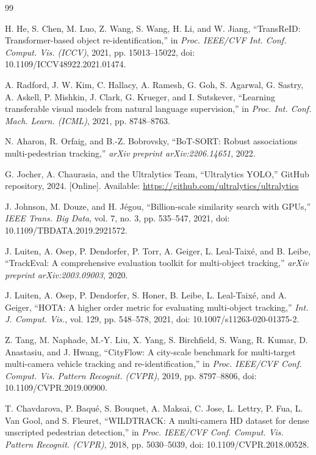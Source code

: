 \documentclass{ieeeaccess}
\begin{document}

\begin{thebibliography}{99}

H. He, S. Chen, M. Luo, Z. Wang, S. Wang, H. Li, and W. Jiang, ``TransReID: Transformer-based object re-identification,'' in \emph{Proc. IEEE/CVF Int. Conf. Comput. Vis. (ICCV)}, 2021, pp. 15013--15022, doi: 10.1109/ICCV48922.2021.01474.

A. Radford, J. W. Kim, C. Hallacy, A. Ramesh, G. Goh, S. Agarwal, G. Sastry, A. Askell, P. Mishkin, J. Clark, G. Krueger, and I. Sutskever, ``Learning transferable visual models from natural language supervision,'' in \emph{Proc. Int. Conf. Mach. Learn. (ICML)}, 2021, pp. 8748--8763.

N. Aharon, R. Orfaig, and B.-Z. Bobrovsky, ``BoT-SORT: Robust associations multi-pedestrian tracking,'' \emph{arXiv preprint arXiv:2206.14651}, 2022.

G. Jocher, A. Chaurasia, and the Ultralytics Team, ``Ultralytics YOLO,'' GitHub repository, 2024. [Online]. Available: \url{https://github.com/ultralytics/ultralytics}

J. Johnson, M. Douze, and H. J\'egou, ``Billion-scale similarity search with GPUs,'' \emph{IEEE Trans. Big Data}, vol. 7, no. 3, pp. 535--547, 2021, doi: 10.1109/TBDATA.2019.2921572.

J. Luiten, A. Osep, P. Dendorfer, P. Torr, A. Geiger, L. Leal-Taix\'e, and B. Leibe, ``TrackEval: A comprehensive evaluation toolkit for multi-object tracking,'' \emph{arXiv preprint arXiv:2003.09003}, 2020.

J. Luiten, A. Osep, P. Dendorfer, S. Honer, B. Leibe, L. Leal-Taix\'e, and A. Geiger, ``HOTA: A higher order metric for evaluating multi-object tracking,'' \emph{Int. J. Comput. Vis.}, vol. 129, pp. 548--578, 2021, doi: 10.1007/s11263-020-01375-2.

Z. Tang, M. Naphade, M.-Y. Liu, X. Yang, S. Birchfield, S. Wang, R. Kumar, D. Anastasiu, and J. Hwang, ``CityFlow: A city-scale benchmark for multi-target multi-camera vehicle tracking and re-identification,'' in \emph{Proc. IEEE/CVF Conf. Comput. Vis. Pattern Recognit. (CVPR)}, 2019, pp. 8797--8806, doi: 10.1109/CVPR.2019.00900.

T. Chavdarova, P. Baqu\'e, S. Bouquet, A. Maksai, C. Jose, L. Lettry, P. Fua, L. Van Gool, and S. Fleuret, ``WILDTRACK: A multi-camera HD dataset for dense unscripted pedestrian detection,'' in \emph{Proc. IEEE/CVF Conf. Comput. Vis. Pattern Recognit. (CVPR)}, 2018, pp. 5030--5039, doi: 10.1109/CVPR.2018.00528.


\end{thebibliography}
\end{document}
